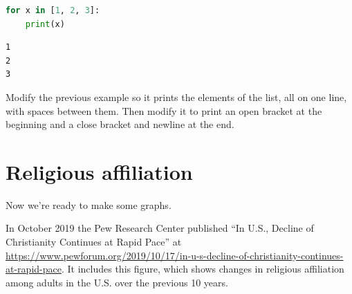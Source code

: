 \begin{lstlisting}[language=Python]
for x in [1, 2, 3]:
    print(x)
\end{lstlisting}

\begin{lstlisting}[]
1
2
3
\end{lstlisting}

Modify the previous example so it prints the elements of the list, all
on one line, with spaces between them. Then modify it to print an open
bracket at the beginning and a close bracket and newline at the end.

\hypertarget{religious-affiliation}{%
\section{Religious affiliation}\label{religious-affiliation}}

Now we're ready to make some graphs.

In October 2019 the Pew Research Center published ``In U.S., Decline of
Christianity Continues at Rapid Pace'' at
\url{https://www.pewforum.org/2019/10/17/in-u-s-decline-of-christianity-continues-at-rapid-pace}.
It includes this figure, which shows changes in religious affiliation
among adults in the U.S. over the previous 10 years.

